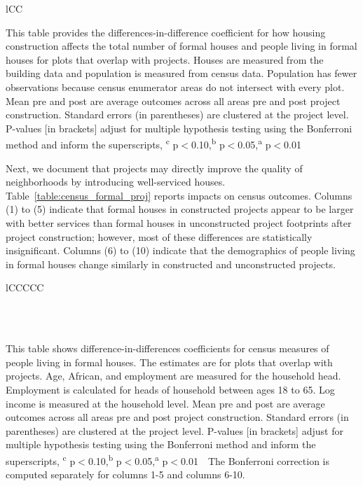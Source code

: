 \documentclass[12pt]{article}
\newcommand{\regtextfirst}{
Mean pre and post are average outcomes across all areas pre and post project construction.  Standard errors (in parentheses) are clustered at the project level.  P-values [in brackets] adjust for multiple hypothesis testing using the Bonferroni method and inform the superscripts, \textsuperscript{c} p$<$0.10,\textsuperscript{b} p$<$0.05,\textsuperscript{a} p$<$0.01 \,\,
}
\newcommand{\rv}{}
\begin{document}
\begin{table}[h!]
\small
\centering
\caption{Direct Effects on Formal Housing and Inhabitants}\label{table:main_formal_proj}
\vspace{-2mm}
\begin{threeparttable}
\begin{tabular}{lCC}
\toprule

\bottomrule
\end{tabular}
\begin{tablenotes}
\item \footnotesize 
This table provides the differences-in-difference coefficient for how housing construction affects the total number of formal houses and people living in formal houses for plots that overlap with projects. Houses are measured from the building data and population is measured from census data.  Population has fewer observations because census enumerator areas do not intersect with every plot. \regtextfirst
\end{tablenotes}
\end{threeparttable}
\end{table}

\rv{Next, we document that projects may directly improve the quality of neighborhoods by introducing well-serviced houses.  Table~\ref{table:census_formal_proj} reports impacts on census outcomes.  Columns (1) to (5) indicate that formal houses in constructed projects appear to be larger with better services than formal houses in unconstructed project footprints after project construction; however, most of these differences are statistically insignificant.  Columns (6) to (10) indicate that the demographics of people living in formal houses change similarly in constructed and unconstructed projects.}


\begin{table}[h!]
\small
\centering
\caption{Direct Effects on Formal Housing Quality and Inhabitant Demographics}\label{table:census_formal_proj}
\vspace{-2mm}
\begin{threeparttable}
\begin{tabular}{lCCCCC}
\toprule

\\
\\\midrule

\bottomrule
\end{tabular}
\begin{tablenotes}
\item \footnotesize This table shows difference-in-differences coefficients for census measures of people living in formal houses.  The estimates are for plots that overlap with projects. Age, African, and employment are measured for the household head.  Employment is calculated for heads of household between ages 18 to 65.  Log income is measured at the household level.   \regtextfirst The Bonferroni correction is computed separately for columns 1-5 and columns 6-10.
\end{tablenotes}
\end{threeparttable}
\end{table}
\end{document}
